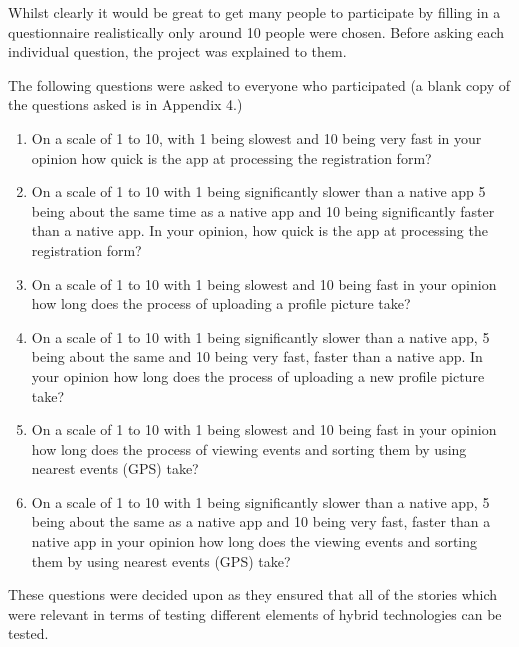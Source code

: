 Whilst clearly it would be great to get many people to participate by filling in a questionnaire realistically only around 10 people were chosen. Before asking each individual question, the project was explained to them.

The following questions were asked to everyone who participated (a blank copy of the questions asked is in  Appendix 4.)

\begin{enumerate}
\item On a scale of 1 to 10, with 1 being slowest and 10 being very fast in your opinion how quick is the app at processing the registration form?
\item On a scale of 1 to 10 with 1 being significantly slower than a native app 5 being about the same time as a native app and 10 being significantly faster than a native app. In your opinion, how quick is the app at processing the registration form?
\item On a scale of 1 to 10 with 1 being slowest and 10 being fast in your opinion how long does the process of uploading a profile picture take?
\item On a scale of 1 to 10 with 1 being significantly slower than a native app, 5 being about the same and 10 being very fast, faster than a native app. In your opinion how long does the process of uploading a new profile picture take?
\item On a scale of 1 to 10 with 1 being slowest and 10 being fast in your opinion how long does the process of viewing events and sorting them by using nearest events (GPS) take?
\item On a scale of 1 to 10 with 1 being significantly slower than a native app, 5 being about the same as a native app and 10 being very fast, faster than a native app in your opinion how long does the viewing events and sorting them by using nearest events (GPS) take?
\end{enumerate}
These questions were decided upon as they ensured that all of the stories which were relevant in terms of testing different elements of hybrid technologies can be tested.
